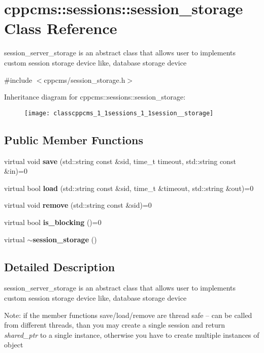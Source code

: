 \section{cppcms\+:\+:sessions\+:\+:session\+\_\+storage Class Reference}
\label{classcppcms_1_1sessions_1_1session__storage}


session\+\_\+server\+\_\+storage is an abstract class that allows user to implements custom session storage device like, database storage device  




{\ttfamily \#include $<$cppcms/session\+\_\+storage.\+h$>$}

Inheritance diagram for cppcms\+:\+:sessions\+:\+:session\+\_\+storage\+:\begin{figure}[H]
\begin{center}
\leavevmode
\texttt{[image: classcppcms\_1\_1sessions\_1\_1session\_\_storage]}
\end{center}
\end{figure}
\subsection*{Public Member Functions}
\begin{DoxyCompactItemize}
\item 
virtual void {\bf save} (std\+::string const \&sid, time\+\_\+t timeout, std\+::string const \&in)=0
\item 
virtual bool {\bf load} (std\+::string const \&sid, time\+\_\+t \&timeout, std\+::string \&out)=0
\item 
virtual void {\bf remove} (std\+::string const \&sid)=0
\item 
virtual bool {\bf is\+\_\+blocking} ()=0
\item 
virtual {\bf $\sim$session\+\_\+storage} ()
\end{DoxyCompactItemize}


\subsection{Detailed Description}
session\+\_\+server\+\_\+storage is an abstract class that allows user to implements custom session storage device like, database storage device 

Note\+: if the member functions save/load/remove are thread safe -- can be called from different threads, than you may create a single session and return {\itshape shared\+\_\+ptr} to a single instance, otherwise you have to create multiple instances of object 

